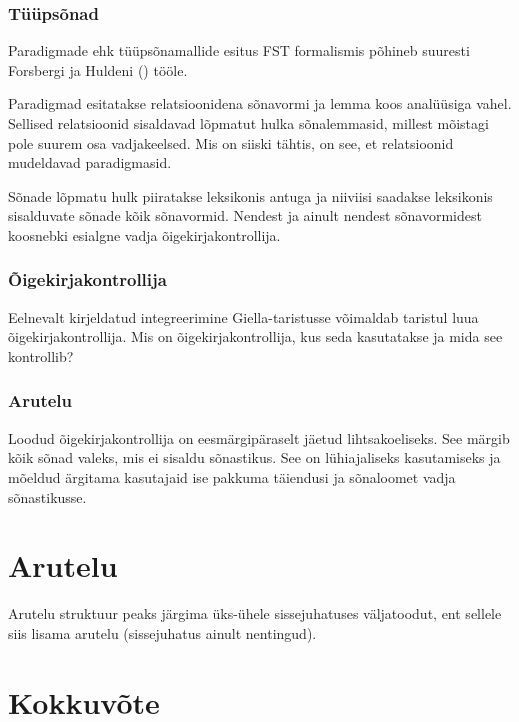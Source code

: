\documentclass[12pt,a4paper]{article}
\begin{document}
\subsubsection{Tüüpsõnad}
\label{sec:giella-tüüpsõnad}

Paradigmade ehk tüüpsõnamallide esitus FST formalismis põhineb suuresti Forsbergi ja Huldeni (\citeyear{forsberg_learning_2016}) tööle.

Paradigmad esitatakse relatsioonidena sõnavormi ja lemma koos analüüsiga vahel. Sellised relatsioonid sisaldavad lõpmatut hulka sõnalemmasid, millest mõistagi pole suurem osa vadjakeelsed. Mis on siiski tähtis, on see, et relatsioonid mudeldavad paradigmasid.

Sõnade lõpmatu hulk piiratakse leksikonis antuga ja niiviisi saadakse leksikonis sisalduvate sõnade kõik sõnavormid. Nendest ja ainult nendest sõnavormidest koosnebki esialgne vadja õigekirja\-kontrollija.

\subsubsection{Õigekirjakontrollija}
\label{sec:giella-õigekirjakontrollija}

Eelnevalt kirjeldatud integreerimine Giella-taristusse võimaldab taristul luua õigekirjakontrollija. Mis on õigekirjakontrollija, kus seda kasutatakse ja mida see kontrollib?

\subsubsection{Arutelu}
\label{sec:giella-arutelu}

Loodud õigekirjakontrollija on eesmärgipäraselt jäetud lihtsakoeliseks. See märgib kõik sõnad valeks, mis ei sisaldu sõnastikus. See on lühiajaliseks kasutamiseks ja mõeldud ärgitama kasutajaid ise pakkuma täiendusi ja sõnaloomet vadja sõnastikusse.



\newpage
\section{Arutelu}

Arutelu struktuur peaks järgima üks-ühele sissejuhatuses väljatoodut, ent sellele siis lisama arutelu (sissejuhatus ainult nentingud).


\newpage
\section{Kokkuvõte}
\end{document}
